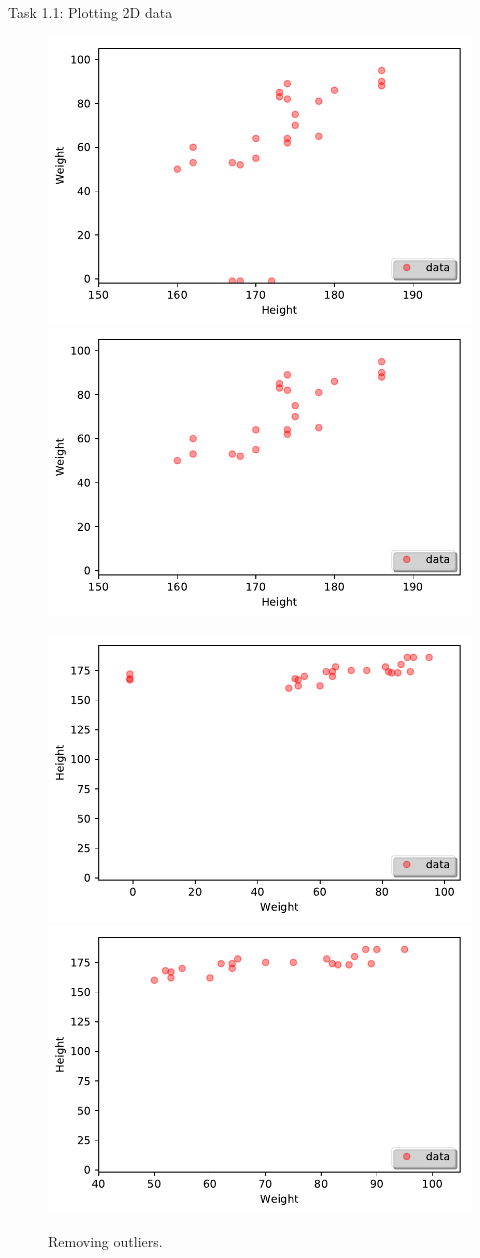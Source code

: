 \documentclass{beamer}
\begin{document}
\begin{frame}{Task 1.1: Plotting 2D data}

\begin{figure}
	\centering
	\includegraphics[width=.4\textwidth]{images/plotHW_outl.pdf}\quad
	\includegraphics[width=.4\textwidth]{images/plotHW.pdf}
	
	\medskip
	
	\includegraphics[width=.4\textwidth]{images/plotWH_outl.pdf}\quad
	\includegraphics[width=.4\textwidth]{images/plotWH.pdf}
	
	\caption{Removing outliers.}
\end{figure}

\end{frame}
\end{document}
